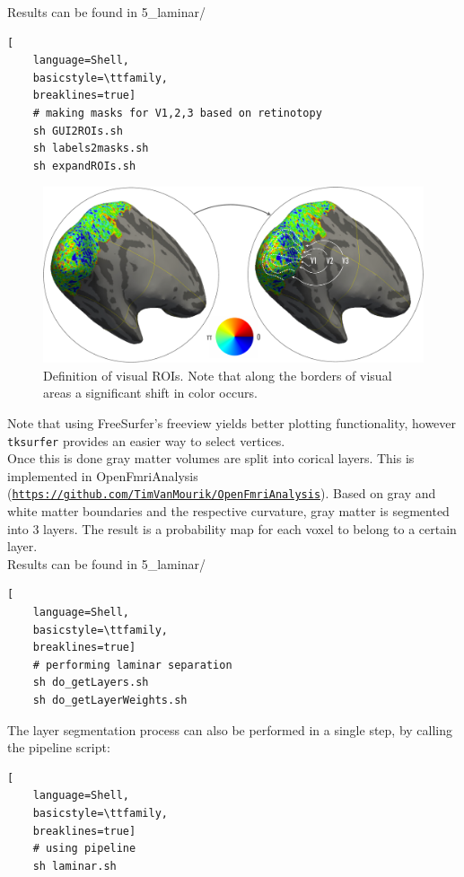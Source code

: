 \documentclass[12pt,a4paper]{scrartcl}
\begin{document}
\noindent Results can be found in 5\_laminar/\\
\begin{lstlisting}[
    language=Shell,
    basicstyle=\ttfamily,
    breaklines=true]
    # making masks for V1,2,3 based on retinotopy
    sh GUI2ROIs.sh
    sh labels2masks.sh
    sh expandROIs.sh
\end{lstlisting}
\begin{figure}
\begin{center}
\includegraphics[width=1\textwidth]{ROIselpRF}
\caption[Example for visual ROI definition]{Definition of visual ROIs. Note that along the borders of visual areas a significant shift in color occurs.}
\label{fig:ROIpRF}
\end{center}
\end{figure}
Note that using FreeSurfer's freeview yields better plotting functionality, however \texttt{tksurfer} provides an easier way to select vertices.\\
Once this is done gray matter volumes are split into corical layers. This is implemented in OpenFmriAnalysis (\href{https://github.com/TimVanMourik/OpenFmriAnalysis}{\nolinkurl{https://github.com/TimVanMourik/OpenFmriAnalysis}}). Based on gray and white matter boundaries and the respective curvature, gray matter is segmented into 3 layers. The result is a probability map for each voxel to belong to a certain layer.\\

\noindent Results can be found in 5\_laminar/\\
\begin{lstlisting}[
    language=Shell,
    basicstyle=\ttfamily,
    breaklines=true]
    # performing laminar separation
    sh do_getLayers.sh
    sh do_getLayerWeights.sh
\end{lstlisting}
The layer segmentation process can also be performed in a single step, by calling the pipeline script:
\begin{lstlisting}[
    language=Shell,
    basicstyle=\ttfamily,
    breaklines=true]
    # using pipeline
    sh laminar.sh
\end{lstlisting}
\end{document}

